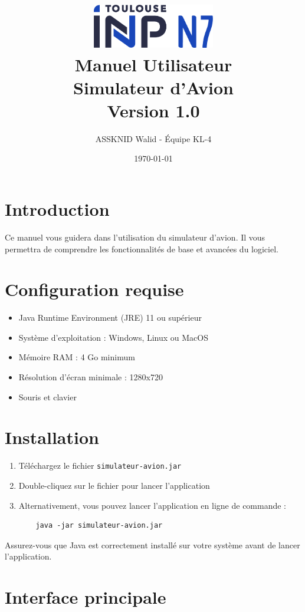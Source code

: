\documentclass[12pt,a4paper]{article}
\title{
    \includegraphics[width=0.4\textwidth]{n7.png}\\[1cm]
    \Huge\textbf{Manuel Utilisateur}\\[0.5cm]
    \Large\textbf{Simulateur d'Avion}\\[0.5cm]
    \large Version 1.0
}
\author{ASSKNID Walid - Équipe KL-4}
\date{\today}
\begin{document}
\maketitle
\thispagestyle{empty}

\tableofcontents
\newpage

\section{Introduction}
Ce manuel vous guidera dans l'utilisation du simulateur d'avion. Il vous permettra de comprendre les fonctionnalités de base et avancées du logiciel.

\section{Configuration requise}
\begin{itemize}
    \item Java Runtime Environment (JRE) 11 ou supérieur
    \item Système d'exploitation : Windows, Linux ou MacOS
    \item Mémoire RAM : 4 Go minimum
    \item Résolution d'écran minimale : 1280x720
    \item Souris et clavier
\end{itemize}

\section{Installation}
\begin{enumerate}
    \item Téléchargez le fichier \texttt{simulateur-avion.jar}
    \item Double-cliquez sur le fichier pour lancer l'application
    \item Alternativement, vous pouvez lancer l'application en ligne de commande :
    \begin{verbatim}
    java -jar simulateur-avion.jar
    \end{verbatim}
\end{enumerate}

\begin{tcolorbox}[note]
Assurez-vous que Java est correctement installé sur votre système avant de lancer l'application.
\end{tcolorbox}

\section{Interface principale}
\end{document}
